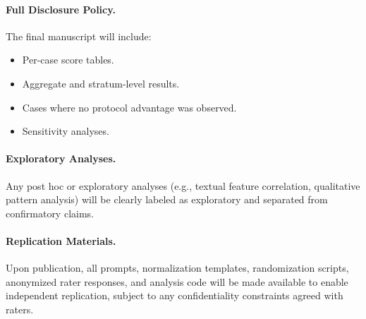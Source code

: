 \paragraph{Full Disclosure Policy.}
The final manuscript will include:
\begin{itemize}
    \item Per-case score tables.
    \item Aggregate and stratum-level results.
    \item Cases where no protocol advantage was observed.
    \item Sensitivity analyses.
\end{itemize}

\paragraph{Exploratory Analyses.}
Any post hoc or exploratory analyses (e.g., textual feature correlation, qualitative pattern analysis) will be clearly labeled as exploratory and separated from confirmatory claims.

\paragraph{Replication Materials.}
Upon publication, all prompts, normalization templates, randomization scripts, anonymized rater responses, and analysis code will be made available to enable independent replication, subject to any confidentiality constraints agreed with raters.
